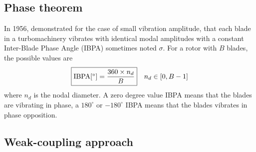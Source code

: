 \subsection{Phase theorem}
\label{sub:lane_theorem}

In 1956, \citet{Lane1956} 
demonstrated for the case of small vibration amplitude,
that each blade in a turbomachinery vibrates with
identical modal amplitudes with a constant Inter-Blade
Phase Angle (IBPA) sometimes noted $\sigma$. For a rotor with $B$ blades,
the possible values are
\begin{equation}
    \fbox{$\textrm{IBPA} [^\circ] = \displaystyle \frac{360 \times n_d}{B}$} \quad n_d \in [0, B-1]
\end{equation}
where $n_d$ is the nodal diameter.
A zero degree value IBPA means that the blades are vibrating in phase, a $180^\circ$ or
$-180^\circ$ IBPA means that the blades vibrates in phase opposition.

\subsection{Weak-coupling approach}
\label{sub:weak_coupling_approach}

